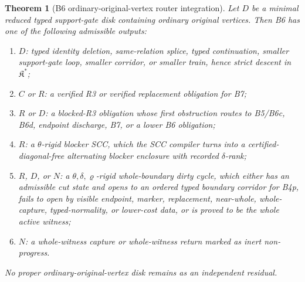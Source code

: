 \documentclass[11pt]{amsart}
\newtheorem{theorem}{Theorem}[section]
\theoremstyle{definition}
\begin{document}
\begin{theorem}[B6 ordinary-original-vertex router integration]
Let \(D\) be a minimal reduced typed support-gate disk containing ordinary original vertices. Then B6 has one of the following admissible outputs:

\begin{enumerate}
\item \(D\): typed identity deletion, same-relation splice, typed continuation, smaller support-gate loop, smaller corridor, or smaller train, hence strict descent in \(\mathfrak K^\ast\);
\item \(C\) or \(R\): a verified R3 or verified replacement obligation for B7;
\item \(R\) or \(D\): a blocked-R3 obligation whose first obstruction routes to B5/B6c, B6d, endpoint discharge, B7, or a lower B6 obligation;
\item \(R\): a \(\theta\)-rigid blocker SCC, which the SCC compiler turns into a certified-diagonal-free alternating blocker enclosure with recorded \(\delta\)-rank;
\item \(R\), \(D\), or \(N\): a \(\theta,\delta,\varrho\)-rigid whole-boundary dirty cycle, which either has an admissible cut state and opens to an ordered typed boundary corridor for B4p, fails to open by visible endpoint, marker, replacement, near-whole, whole-capture, typed-normality, or lower-cost data, or is proved to be the whole active witness;
\item \(N\): a whole-witness capture or whole-witness return marked as inert non-progress.
\end{enumerate}

No proper ordinary-original-vertex disk remains as an independent residual.

\end{theorem}
\end{document}
